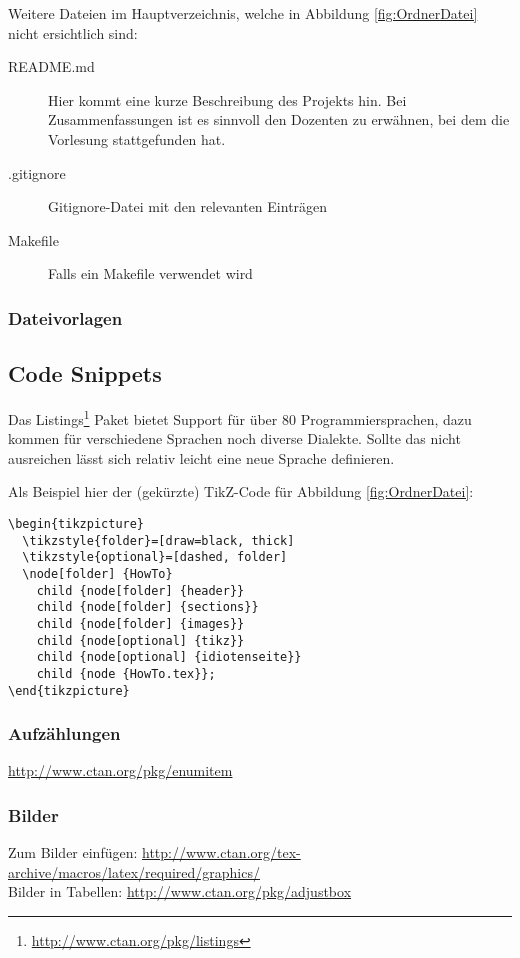 Weitere Dateien im Hauptverzeichnis, welche in Abbildung \ref{fig:OrdnerDatei} nicht ersichtlich sind:
\begin{description}
  \item[README.md] Hier kommt eine kurze Beschreibung des Projekts hin. Bei Zusammenfassungen ist es sinnvoll den Dozenten zu erwähnen,
  	bei dem die Vorlesung stattgefunden hat.
  \item[.gitignore] Gitignore-Datei mit den relevanten Einträgen
  \item[Makefile]	Falls ein Makefile verwendet wird
\end{description}

\subsubsection{Dateivorlagen}


\subsection{Code Snippets}
Das Listings\footnote{\url{http://www.ctan.org/pkg/listings}} Paket bietet Support für über 80 Programmiersprachen, dazu kommen für verschiedene Sprachen noch diverse Dialekte. Sollte das nicht
ausreichen lässt sich relativ leicht eine neue Sprache definieren.

Als Beispiel hier der (gekürzte) TikZ-Code für Abbildung \ref{fig:OrdnerDatei}:
\begin{lstlisting}
\begin{tikzpicture}
  \tikzstyle{folder}=[draw=black, thick]
  \tikzstyle{optional}=[dashed, folder]
  \node[folder] {HowTo}
    child {node[folder] {header}}
    child {node[folder] {sections}}
    child {node[folder] {images}}
    child {node[optional] {tikz}}
    child {node[optional] {idiotenseite}}
    child {node {HowTo.tex}};
\end{tikzpicture}
\end{lstlisting}


\subsubsection{Aufzählungen}
\url{http://www.ctan.org/pkg/enumitem}

\subsubsection{Bilder}
Zum Bilder einfügen: \url{http://www.ctan.org/tex-archive/macros/latex/required/graphics/} \\
Bilder in Tabellen: \url{http://www.ctan.org/pkg/adjustbox}

